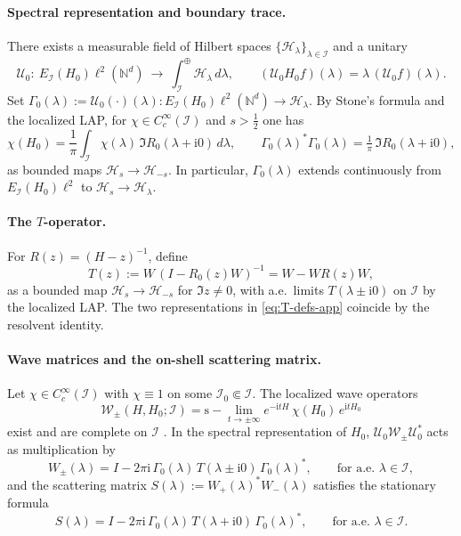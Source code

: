 \documentclass[10pt]{amsart}
\newcommand{\N}{{\mathbb{N}}}
\newcommand{\1}{{\mathbb{I}}}
\newcommand{\Hc}{\mathcal{H}}
\newcommand{\Ic}{\mathcal{I}}
\newcommand{\Wc}{\mathcal{W}}
\newcommand{\Uc}{\mathcal{U}}
\numberwithin{equation}{section}
\begin{document}
\paragraph{Spectral representation and boundary trace.}
There exists a measurable field of Hilbert spaces $\{\mathscr H_\lambda\}_{\lambda\in \Ic}$ and a unitary
\[
\Uc_0:\ E_\Ic(H_{0})\ell^2(\N^d)\ \longrightarrow\ \int_\Ic^\oplus \mathscr H_\lambda\,d\lambda,
\qquad (\Uc_0 H_{0} f)(\lambda)=\lambda\,(\Uc_0 f)(\lambda).
\]
Set $\Gamma_0(\lambda):=\Uc_0(\cdot)(\lambda):E_\Ic(H_{0})\ell^2(\N^d)\to\mathscr H_\lambda$.
By Stone's formula and the localized LAP, for $\chi\in C_c^\infty(\Ic)$ and $s>\tfrac12$ one has
\begin{equation}\label{eq:stone-app}
\chi(H_{0})=\frac{1}{\pi}\int_\Ic\!\chi(\lambda)\,\Im R_{0}(\lambda+\mathrm i0)\,d\lambda,
\qquad
\Gamma_0(\lambda)^*\Gamma_0(\lambda)=\tfrac{1}{\pi}\,\Im R_{0}(\lambda+\mathrm i0),
\end{equation}
as bounded maps $\Hc_s\to\Hc_{-s}$.
In particular, $\Gamma_0(\lambda)$ extends continuously from $E_\Ic(H_0)\ell^2$ to $\Hc_s\to\mathscr H_\lambda$.

\paragraph{The $T$-operator.}
For $R(z)=(H-z)^{-1}$, define
\begin{equation}\label{eq:T-defs-app}
T(z):=W\,(I- R_{0}(z)W)^{-1}=W- W R(z) W,
\end{equation}
as a bounded map $\Hc_s\to\Hc_{-s}$ for $\Im z\neq0$, with a.e.\ limits $T(\lambda\pm\mathrm i0)$ on $\Ic$ by the localized LAP.
The two representations in \eqref{eq:T-defs-app} coincide by the resolvent identity.

\paragraph{Wave matrices and the on-shell scattering matrix.}
Let $\chi\in C_c^\infty(\Ic)$ with $\chi\equiv1$ on some $\Ic_0\Subset \Ic$.
The localized wave operators
\[
\Wc_\pm(H,H_{0};\Ic)=\mathrm{s}\!-\!\lim_{t\to\pm\infty}e^{-\mathrm i tH}\,\chi(H_{0})\,e^{\mathrm i tH_{0}}
\]
exist and are complete on $\Ic$ \cite[Thm.~7.7.1]{ABG}. In the spectral representation of $H_{0}$, $\Uc_0 \Wc_\pm \Uc_0^*$ acts as multiplication by
\begin{equation}\label{eq:Wpm}
W_\pm(\lambda)=I-2\pi\mathrm i\,\Gamma_0(\lambda)\,T(\lambda\pm\mathrm i0)\,\Gamma_0(\lambda)^*,
\qquad \text{for a.e. }\lambda\in \Ic,
\end{equation}
and the scattering matrix $S(\lambda):=W_+(\lambda)^*W_-(\lambda)$ satisfies the stationary formula
\begin{equation}\label{eq:S-stationary}
S(\lambda)=I-2\pi\mathrm i\,\Gamma_0(\lambda)\,T(\lambda+\mathrm i0)\,\Gamma_0(\lambda)^*,
\qquad \text{for a.e. }\lambda\in \Ic.
\end{equation}
\end{document}
